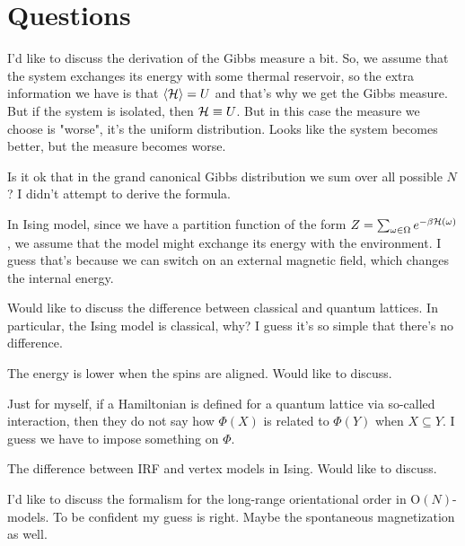 \section{Questions}

\begin{quest}
I'd like to discuss the derivation of the Gibbs measure a bit. So, we assume that the system exchanges its energy with some thermal reservoir, so the extra information we have is that $\left\langle \mathcal{H} \right\rangle = U$ and that's why we get the Gibbs measure. But if the system is isolated, then $\mathcal{H} \equiv U$. But in this case the measure we choose is "worse", it's the uniform distribution. Looks like the system becomes better, but the measure becomes worse. 
\end{quest}

\begin{quest}
Is it ok that in the grand canonical Gibbs distribution we sum over all possible $N$? I didn't attempt to derive the formula.
\end{quest}

\begin{quest}
In Ising model, since we have a partition function of the form $Z = \sum_{\omega \in \Omega} e^{-\beta \mathcal{H} (\omega)}$, we assume that the model might exchange its energy with the environment. I guess that's because we can switch on an external magnetic field, which changes the internal energy.
\end{quest}

\begin{quest}
Would like to discuss the difference between classical and quantum lattices. In particular, the Ising model is classical, why? I guess it's so simple that there's no difference.
\end{quest}

\begin{quest}
The energy is lower when the spins are aligned. Would like to discuss.
\end{quest}

\begin{quest}
Just for myself, if a Hamiltonian is defined for a quantum lattice via so-called interaction, then they do not say how $\Phi(X)$ is related to $\Phi(Y)$ when $X \subseteq Y$. I guess we have to impose something on $\Phi$. 
\end{quest}

\begin{quest}
The difference between IRF and vertex models in Ising. Would like to discuss.
\end{quest}

\begin{quest}
I'd like to discuss the formalism for the long-range orientational order in $\text{O}(N)$-models. To be confident my guess is right. Maybe the spontaneous magnetization as well.
\end{quest}